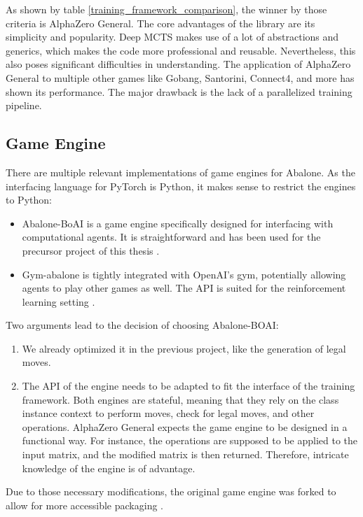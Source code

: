 As shown by table \ref{training_framework_comparison}, the winner by those criteria is AlphaZero General. The core advantages of the library are its simplicity and popularity. Deep MCTS makes use of a lot of abstractions and generics, which makes the code more professional and reusable. Nevertheless, this also poses significant difficulties in understanding. The application of AlphaZero General to multiple other games like Gobang, Santorini, Connect4, and more has shown its performance. The major drawback is the lack of a parallelized training pipeline.

\subsection{Game Engine}
There are multiple relevant implementations of game engines for Abalone. As the interfacing language for PyTorch is Python, it makes sense to restrict the engines to Python:

\begin{itemize}
    \item Abalone-BoAI is a game engine specifically designed for interfacing with computational agents. It is straightforward and has been used for the precursor project of this thesis \cite{scriptim_scriptimabalone-boai_2021}.
    \item Gym-abalone is tightly integrated with OpenAI's gym, potentially allowing agents to play other games as well. The API is suited for the reinforcement learning setting \cite{towzeur_towzeurgym-abalone_2021}.
\end{itemize}

Two arguments lead to the decision of choosing Abalone-BOAI:
\begin{enumerate}
    \item We already optimized it in the previous project, like the generation of legal moves.
    \item The API of the engine needs to be adapted to fit the interface of the training framework. Both engines are stateful, meaning that they rely on the class instance context to perform moves, check for legal moves, and other operations. AlphaZero General expects the game engine to be designed in a functional way. For instance, the operations are supposed to be applied to the input matrix, and the modified matrix is then returned. Therefore, intricate knowledge of the engine is of advantage.
\end{enumerate}

Due to those necessary modifications, the original game engine was forked to allow for more accessible packaging \cite{campfireman_campfiremanabalone-boai_2021}.

